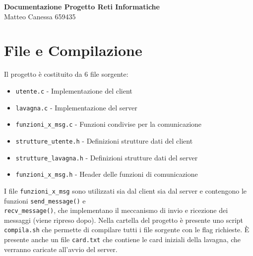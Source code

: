 \documentclass[a4paper,11pt]{article}
\begin{document}
\begin{center}
    \Large\textbf{Documentazione Progetto Reti Informatiche}\\[0.2cm]
    \normalsize Matteo Canessa 659435
\end{center}
\vspace{0.3cm}

\section*{File e Compilazione}

Il progetto è costituito da 6 file sorgente:

\begin{itemize}
    \item \texttt{utente.c} - Implementazione del client
    \item \texttt{lavagna.c} - Implementazione del server
    \item \texttt{funzioni\_x\_msg.c} - Funzioni condivise per la comunicazione
    \item \texttt{strutture\_utente.h} - Definizioni strutture dati del client
    \item \texttt{strutture\_lavagna.h} - Definizioni strutture dati del server
    \item \texttt{funzioni\_x\_msg.h} - Header delle funzioni di comunicazione
\end{itemize}

\noindent I file \texttt{funzioni\_x\_msg} sono utilizzati sia dal client sia dal server e contengono le 
funzioni \texttt{send\_message()} e \\ 
\texttt{recv\_message()}, che implementano il meccanismo di invio e ricezione dei messaggi (viene ripreso dopo).
Nella cartella del progetto è presente uno script \texttt{compila.sh} che permette di compilare tutti i file sorgente con le flag richieste.
È presente anche un file \texttt{card.txt} che contiene le card iniziali della lavagna, che verranno caricate all'avvio del server.
\end{document}
